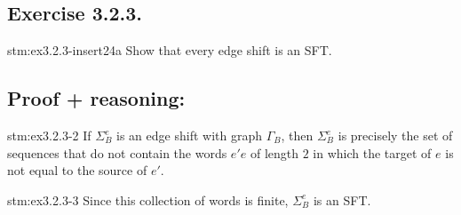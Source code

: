 \subsection*{Exercise 3.2.3.}

\begin{exercise}{stm:ex3.2.3-insert24a}
Show that every edge shift is an SFT.
\end{exercise}

\subsection*{Proof {\color{blue}+ reasoning}:}

\begin{statement}{stm:ex3.2.3-2}
If $\Sigma_B^e$ is an edge shift with graph $\Gamma_B$, then $\Sigma_B^e$ is precisely the set of sequences that do not contain the words $e'e$ of length $2$ in which the target of $e$ is not equal to the source of $e'$.
\end{statement}

\begin{statement}{stm:ex3.2.3-3}
Since this collection of words is finite, $\Sigma_B^e$ is an SFT.
\end{statement}
